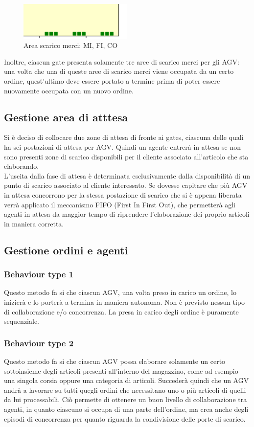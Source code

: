 \documentclass[12pt]{article}
\begin{document}
\begin{figure}[H]
\centering
\includegraphics[width=0.5\textwidth]{Figures/Map/gates2.png}
\caption{Area scarico merci: MI, FI, CO}
\end{figure}

\noindent Inoltre, ciascun gate presenta solamente tre aree di scarico merci per gli AGV: una volta che una di queste aree di scarico merci viene occupata da un certo ordine, quest'ultimo deve essere portato a termine prima di poter essere nuovamente occupata con un nuovo ordine.

\subsection{Gestione area di atttesa}
Si è deciso di collocare due zone di attesa di fronte ai gates, ciascuna delle quali ha sei postazioni di attesa per AGV. Quindi un agente entrerà in attesa se non sono presenti zone di scarico disponibili per il cliente associato all'articolo che sta elaborando. \\
L'uscita dalla fase di attesa è determinata esclusivamente dalla disponibilità di un punto di scarico associato al cliente interessato. Se dovesse capitare che più AGV in attesa concorrono per la stessa postazione di scarico che si è appena liberata verrà applicato il meccanismo FIFO (First In First Out), che permetterà agli agenti in attesa da maggior tempo di riprendere l'elaborazione dei proprio articoli in maniera corretta.
\newpage

\subsection{Gestione ordini e agenti}
\subsubsection{Behaviour type 1}
Questo metodo fa si che ciascun AGV, una volta preso in carico un ordine, lo inizierà e lo porterà a termina in maniera autonoma. Non è previsto nessun tipo di collaborazione e/o concorrenza. La presa in carico degli ordine è puramente sequenziale. 

\subsubsection{Behaviour type 2}
Questo metodo fa si che ciascun AGV possa elaborare solamente un certo sottoinsieme degli articoli presenti all'interno del magazzino, come ad esempio una singola corsia oppure una categoria di articoli. Succederà quindi che un AGV andrà a lavorare su tutti quegli ordini che necessitano uno o più articoli di quelli da lui processabili. Ciò permette di ottenere un buon livello di collaborazione tra agenti, in quanto ciascuno si occupa di una parte dell'ordine, ma crea anche degli episodi di concorrenza per quanto riguarda la condivisione delle porte di scarico.
\end{document}
